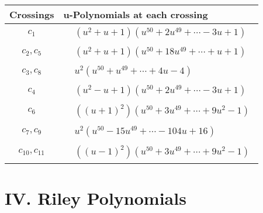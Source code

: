 \documentclass[1p]{elsarticle_modified}
\theoremstyle{definition}
\begin{document}
\begin{tabular}{m{50pt}|m{274pt}}
Crossings & \hspace{64pt}u-Polynomials at each crossing \\
\hline $$\begin{aligned}c_{1}\end{aligned}$$&$\begin{aligned}
&(u^2+u+1)(u^{50}+2 u^{49}+\cdots-3 u+1)
\end{aligned}$\\
\hline $$\begin{aligned}c_{2},c_{5}\end{aligned}$$&$\begin{aligned}
&(u^2+u+1)(u^{50}+18 u^{49}+\cdots+u+1)
\end{aligned}$\\
\hline $$\begin{aligned}c_{3},c_{8}\end{aligned}$$&$\begin{aligned}
&u^2(u^{50}+u^{49}+\cdots+4 u-4)
\end{aligned}$\\
\hline $$\begin{aligned}c_{4}\end{aligned}$$&$\begin{aligned}
&(u^2- u+1)(u^{50}+2 u^{49}+\cdots-3 u+1)
\end{aligned}$\\
\hline $$\begin{aligned}c_{6}\end{aligned}$$&$\begin{aligned}
&((u+1)^2)(u^{50}+3 u^{49}+\cdots+9 u^2-1)
\end{aligned}$\\
\hline $$\begin{aligned}c_{7},c_{9}\end{aligned}$$&$\begin{aligned}
&u^2(u^{50}-15 u^{49}+\cdots-104 u+16)
\end{aligned}$\\
\hline $$\begin{aligned}c_{10},c_{11}\end{aligned}$$&$\begin{aligned}
&((u-1)^2)(u^{50}+3 u^{49}+\cdots+9 u^2-1)
\end{aligned}$\\
\hline
\end{tabular}\newpage\renewcommand{\arraystretch}{1}
\centering \section*{ IV. Riley Polynomials}
\end{document}
